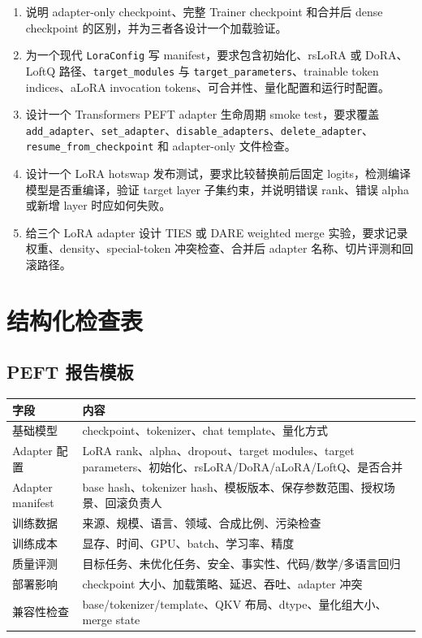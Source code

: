 \documentclass[UTF8,zihao=-4,openany]{ctexbook}
\begin{document}
\begin{enumerate}
\item 说明 adapter-only checkpoint、完整 Trainer checkpoint 和合并后 dense checkpoint 的区别，并为三者各设计一个加载验证。
\item 为一个现代 \texttt{LoraConfig} 写 manifest，要求包含初始化、rsLoRA 或 DoRA、LoftQ 路径、\texttt{target\_modules} 与 \texttt{target\_parameters}、trainable token indices、aLoRA invocation tokens、可合并性、量化配置和运行时配置。
\item 设计一个 Transformers PEFT adapter 生命周期 smoke test，要求覆盖 \texttt{add\_adapter}、\texttt{set\_adapter}、\texttt{disable\_adapters}、\texttt{delete\_adapter}、\texttt{resume\_from\_checkpoint} 和 adapter-only 文件检查。
\item 设计一个 LoRA hotswap 发布测试，要求比较替换前后固定 logits，检测编译模型是否重编译，验证 target layer 子集约束，并说明错误 rank、错误 alpha 或新增 layer 时应如何失败。
\item 给三个 LoRA adapter 设计 TIES 或 DARE weighted merge 实验，要求记录权重、density、special-token 冲突检查、合并后 adapter 名称、切片评测和回滚路径。
\end{enumerate}

\section{结构化检查表}
\subsection{PEFT 报告模板}
\begin{center}
\begin{tabular}{p{}p{}}
\toprule
字段 & 内容 \\
\midrule
基础模型 & checkpoint、tokenizer、chat template、量化方式 \\
Adapter 配置 & LoRA rank、alpha、dropout、target modules、target parameters、初始化、rsLoRA/DoRA/aLoRA/LoftQ、是否合并 \\
Adapter manifest & base hash、tokenizer hash、模板版本、保存参数范围、授权场景、回滚负责人 \\
训练数据 & 来源、规模、语言、领域、合成比例、污染检查 \\
训练成本 & 显存、时间、GPU、batch、学习率、精度 \\
质量评测 & 目标任务、未优化任务、安全、事实性、代码/数学/多语言回归 \\
部署影响 & checkpoint 大小、加载策略、延迟、吞吐、adapter 冲突 \\
兼容性检查 & base/tokenizer/template、QKV 布局、dtype、量化组大小、merge state \\
\bottomrule
\end{tabular}
\end{center}
\end{document}
